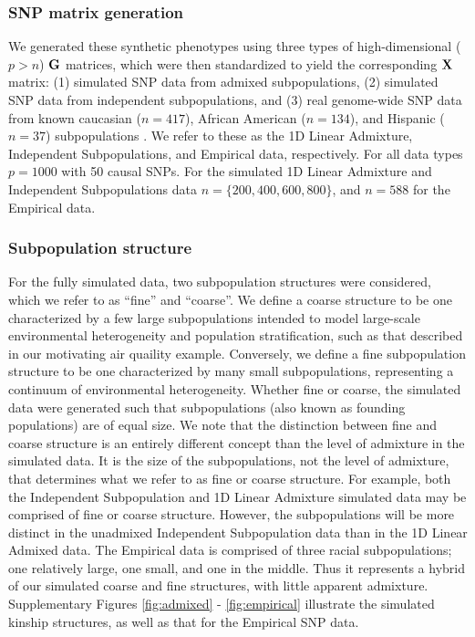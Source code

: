 \subsubsection{SNP matrix generation}

We generated these synthetic phenotypes using three types of high-dimensional ($p > n$) $\textbf{G}$ matrices, which were then standardized to yield the corresponding $\textbf{X}$ matrix: (1) simulated SNP data from admixed subpopulations, (2) simulated SNP data from independent subpopulations, and (3) real genome-wide SNP data from known caucasian ($n = 417$), African American ($n = 134$), and Hispanic ($n = 37$) subpopulations \citep{larkin2015objectives}. We refer to these as the 1D Linear Admixture, Independent Subpopulations, and Empirical data, respectively. For all data types $p = 1000$ with 50 causal SNPs. For the simulated 1D Linear Admixture and Independent Subpopulations data $n = \{200, 400, 600, 800 \}$, and $n = 588$ for the Empirical data. 


\subsubsection{Subpopulation structure}
\label{sec:subpopulation_structure}
For the fully simulated data, two subpopulation structures were considered, which we refer to as ``fine'' and ``coarse''.  We define a coarse structure to be one characterized by a few large subpopulations intended to model large-scale environmental heterogeneity and population stratification, such as that described in our motivating air quaility example. Conversely, we define a fine subpopulation structure to be one characterized by many small subpopulations, representing a continuum of environmental heterogeneity. Whether fine or coarse, the simulated data were generated such that subpopulations (also known as founding populations) are of equal size. We note that the distinction between fine and coarse structure is an entirely different concept than the level of admixture in the simulated data. It is the size of the subpopulations, not the level of admixture, that determines what we refer to as fine or coarse structure. For example, both the Independent Subpopulation and 1D Linear Admixture simulated data may be comprised of fine or coarse structure. However, the subpopulations will be more distinct in the unadmixed Independent Subpopulation data than in the 1D Linear Admixed data. The Empirical data is comprised of three racial subpopulations; one relatively large, one small, and one in the middle. Thus it represents a hybrid of our simulated coarse and fine structures, with little apparent admixture. Supplementary Figures \ref{fig:admixed} - \ref{fig:empirical} illustrate the simulated kinship structures, as well as that for the Empirical SNP data. 

